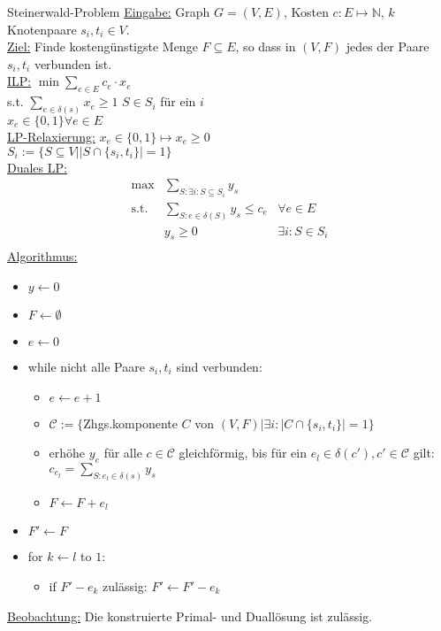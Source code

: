 \begin{section}{Steinerwald-Problem}
 \underline{Eingabe:} Graph $G=(V,E)$, Kosten $c: E \mapsto \mathbb{N}$, $k$ Knotenpaare $s_i,t_i \in V$.\\
 \underline{Ziel:} Finde kostengünstigste Menge $F\subseteq E$, so dass in $(V,F)$ jedes der Paare $s_i,t_i$ verbunden ist.\\
 \underline{ILP:} $\min \sum_{e \in E} c_e\cdot x_e$\\
 s.t. $\sum_{e\in \delta(s)} x_e \geq 1$   $S\in S_i$ für ein $i$\\
 $x_e \in \{0,1\} \forall e\in E$\\
 \underline{LP-Relaxierung:} $x_e \in \{0,1\} \mapsto x_e \geq 0$\\
 $S_i := \{S\subseteq V| |S\cap \{s_i,t_i\}| = 1\}$\\
 \underline{Duales LP:} 
 \begin{align*}
  \max &\sum_{S: \exists i: S \subseteq S_i} y_s\\
  \text{s.t.} &\sum_{S: e\in \delta(S)} y_s\leq c_e &\forall e\in E\\
  &y_s \geq 0 &\exists i: S\in S_i\\                          
 \end{align*}
 \underline{Algorithmus:} 
 \begin{itemize}
  \item $y \leftarrow 0$
  \item $F \leftarrow \emptyset$
  \item $e \leftarrow 0$
  \item while nicht alle Paare $s_i,t_i$ sind verbunden:
  \begin{itemize}
   \item $e\leftarrow e+1$
   \item $\mathcal{C}:= \{$Zhgs.komponente $ C $ von $ (V,F)| \exists i: |C\cap \{s_i,t_i\}| = 1\}$
   \item erhöhe $y_e$ für alle $c\in \mathcal{C}$ gleichförmig, bis für ein $e_l \in \delta(c'),c'\in \mathcal{C}$ gilt: $c_{e_l} = \sum_{S: e_l\in \delta(s)} y_s$
   \item $F\leftarrow F + e_l$
  \end{itemize}
  \item $F' \leftarrow F$
  \item for $k \leftarrow l$ to $1$:
  \begin{itemize}
   \item if $F' - e_k$ zulässig: $F' \leftarrow F' - e_k$
  \end{itemize}
 \end{itemize}
 \underline{Beobachtung:} Die konstruierte Primal- und Duallösung ist zulässig.
 

\end{section}
